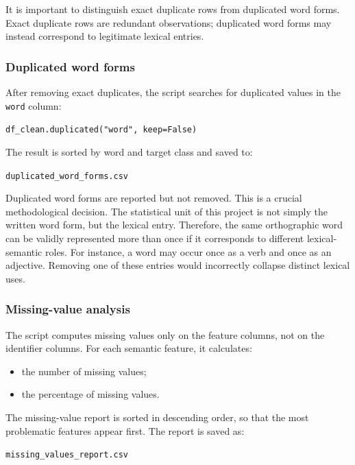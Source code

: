\documentclass{ipgpmaster}
\begin{document}
It is important to distinguish exact duplicate rows from duplicated word forms. Exact duplicate rows are redundant observations; duplicated word forms may instead correspond to legitimate lexical entries.

\subsubsection{Duplicated word forms}

After removing exact duplicates, the script searches for duplicated values in the \texttt{word} column:

\begin{center}
\texttt{df\_clean.duplicated("word", keep=False)}
\end{center}

The result is sorted by word and target class and saved to:

\begin{center}
\texttt{duplicated\_word\_forms.csv}
\end{center}

Duplicated word forms are reported but not removed. This is a crucial methodological decision. The statistical unit of this project is not simply the written word form, but the lexical entry. Therefore, the same orthographic word can be validly represented more than once if it corresponds to different lexical-semantic roles. For instance, a word may occur once as a verb and once as an adjective. Removing one of these entries would incorrectly collapse distinct lexical uses.

\subsubsection{Missing-value analysis}

The script computes missing values only on the feature columns, not on the identifier columns. For each semantic feature, it calculates:

\begin{itemize}
    \item the number of missing values;
    \item the percentage of missing values.
\end{itemize}

The missing-value report is sorted in descending order, so that the most problematic features appear first. The report is saved as:

\begin{center}
\texttt{missing\_values\_report.csv}
\end{center}
\end{document}
